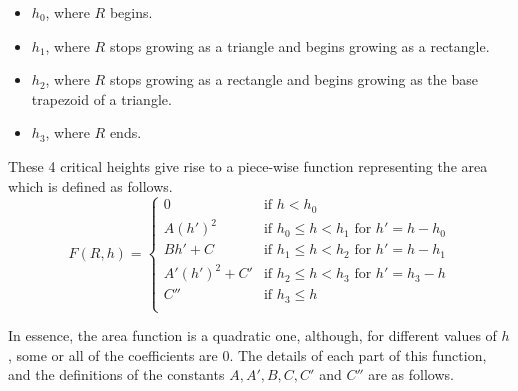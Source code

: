 \begin{itemize}
\item $h_0$, where $R$ begins.
\item $h_1$, where $R$ stops growing as a triangle and begins growing as a rectangle.
\item $h_2$, where $R$ stops growing as a rectangle and begins growing as the base trapezoid of a triangle.
\item $h_3$, where $R$ ends.
\end{itemize}

These 4 critical heights give rise to a piece-wise function representing the area which is defined as follows.
\[
F(R, h) = \begin{cases}
0                  & \text{if }          h < h_0 \\
A(h')^2            & \text{if } h_0 \leq h < h_1 \text{ for } h' = h - h_0 \\
Bh' + C            & \text{if } h_1 \leq h < h_2 \text{ for } h' = h - h_1 \\
A'(h')^2 + C'      & \text{if } h_2 \leq h < h_3 \text{ for } h' = h_3 - h \\
C''                & \text{if } h_3 \leq h \\
\end{cases}
\]

In essence, the area function is a quadratic one, although, for different values of $h$, some or all of the coefficients are 0. The details of each part of this function, and the definitions of the constants $A, A', B, C, C'$ and $C''$ are as follows.

